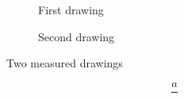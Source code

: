 \documentclass{article}
\begin{document}
\begin{figure}[ht]
\centering
\begin{subfigure}{.35\textwidth}
\caption{First drawing}
\end{subfigure}
\hfill
\begin{subfigure}{.35\textwidth}
\caption{Second drawing}
\end{subfigure}
\caption{Two measured drawings}
\label{fig:drawing}
\end{figure}

\[
\frac{a}{}
\]
\end{document}
